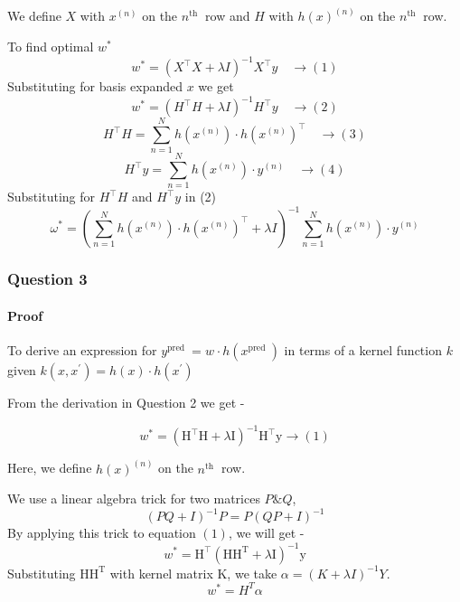 \documentclass[11pt]{article}
\begin{document}
We define \(X\) with \(x^{(n)}\) on the \(n^{\text {th }}\) row and
\(H\) with \(h(x)^{(n)}\) on the \(n^{\text {th }}\) row.

To find optimal \(w^{*}\) \[
w^{*}=\left(X^{\top} X+\lambda I\right)^{-1} X^{\top} y \quad \rightarrow(1)
\] Substituting for basis expanded \(x\) we get \[
w^{*}=\left(H^{\top} H +\lambda I\right)^{-1} H^{\top} y  \quad \rightarrow(2)
\] \[
H^{\top} H=\sum_{n=1}^{N} h\left(x^{(n)}\right) \cdot h\left(x^{(n)}\right)^{\top} \quad \rightarrow(3)
\] \[
H^{\top} y=\sum_{n=1}^{N} h\left(x^{(n)}\right) \cdot y^{(n)} \quad \rightarrow(4)
\] Substituting for \(H^{\top}H\) and \(H^{\top}y\) in (2) \[
\omega^{*}=\left(\sum_{n=1}^{N} h\left(x^{(n)}\right) \cdot h\left(x^{(n)}\right)^{\top}+\lambda I\right)^{-1} \sum_{n=1}^{N} h\left(x^{(n)}\right) \cdot y^{(n)}
\]

\newpage

    \hypertarget{question-3}{%
\subsubsection{Question 3}\label{question-3}}

    \hypertarget{proof}{%
\paragraph{Proof}\label{proof}}

    To derive an expression for
\(y^{\text {pred }}=w^{} \cdot h\left(x^{\text {pred }}\right)\) in
terms of a kernel function \(k\) given
\(k\left(x, x^{\prime}\right)=h(x) \cdot h\left(x^{\prime}\right)\)

From the derivation in Question 2 we get -

\[
w^{*}=\left(\mathrm{H}^{\top} \mathrm{H}+\lambda \mathrm{I}\right)^{-1} \mathrm{H}^{\top} \mathrm{y} \rightarrow(1)
\]

Here, we define \(h(x)^{(n)}\) on the \(n^{\text {th }}\) row.

We use a linear algebra trick for two matrices \(P \& Q\), \[
(P Q+I)^{-1} P=P(Q P+I)^{-1}
\] By applying this trick to equation \((1)\), we will get - \[
w^{*}=\mathrm{H}^{\top}\left(\mathrm{HH}^{\mathrm{T}}+\lambda\mathrm{I}\right)^{-1} \mathrm{y}
\] Substituting $\mathrm{HH}^{\mathrm{T}}$ with kernel matrix $\mathrm{K}$, we take
\(\alpha=\left(K+\lambda I\right)^{-1} Y\). \[
w^{*}=H^{T} \alpha
\]
\end{document}
